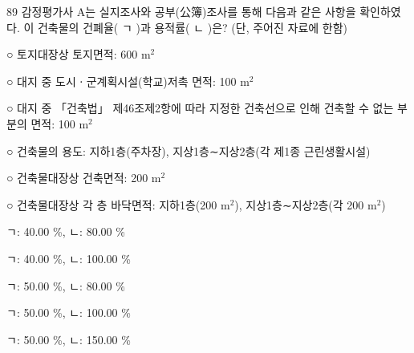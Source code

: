 \begin{question}{89}
감정평가사 A는 실지조사와 공부(公簿)조사를 통해 다음과 같은 사항을 확인하였다. 이 건축물의 건폐율( ㄱ )과 용적률( ㄴ )은? (단, 주어진 자료에 한함)
\begin{framedtext}
○ 토지대장상 토지면적: 600 m$^{2}$ \par
○ 대지 중 도시ㆍ군계획시설(학교)저촉 면적: 100 m$^{2}$ \par
○ 대지 중 「건축법」 제46조제2항에 따라 지정한 건축선으로 인해 건축할 수 없는 부분의 면적: 100 m$^{2}$ \par
○ 건축물의 용도: 지하1층(주차장), 지상1층∼지상2층(각 제1종 근린생활시설) \par
○ 건축물대장상 건축면적: 200 m$^{2}$ \par
○ 건축물대장상 각 층 바닥면적: 지하1층(200 m$^{2}$), 지상1층∼지상2층(각 200 m$^{2}$) \par
\end{framedtext}
\begin{choices}
  \item ㄱ: 40.00 \%, ㄴ: 80.00 \%
  \item ㄱ: 40.00 \%, ㄴ: 100.00 \%
  \item ㄱ: 50.00 \%, ㄴ: 80.00 \%
  \item ㄱ: 50.00 \%, ㄴ: 100.00 \%
  \item ㄱ: 50.00 \%, ㄴ: 150.00 \%
\end{choices}
\end{question}
